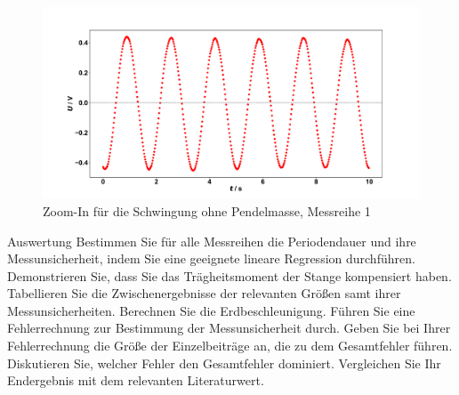 \begin{figure}[H]
	\centering
	\includegraphics[width=1\textwidth]{zoomin_schwingung1_ohne.pdf}
	\caption{Zoom-In für die Schwingung ohne Pendelmasse, Messreihe 1}
	\label{fig:zoomin_schwingung1_ohne}
\end{figure} 



\begin{aufgabe}{Auswertung}
  Bestimmen Sie für alle Messreihen die Periodendauer und ihre
  Messunsicherheit, indem Sie eine geeignete lineare Regression
  durchführen. Demonstrieren Sie, dass Sie das Trägheitsmoment der
  Stange kompensiert haben. Tabellieren Sie die Zwischenergebnisse
  der relevanten Größen samt ihrer Messunsicherheiten. Berechnen
  Sie die Erdbeschleunigung. Führen Sie eine Fehlerrechnung zur
  Bestimmung der Messunsicherheit durch. Geben Sie bei Ihrer
  Fehlerrechnung die Größe der Einzelbeiträge an, die zu dem
  Gesamtfehler führen. Diskutieren Sie, welcher Fehler den
  Gesamtfehler dominiert. Vergleichen Sie Ihr Endergebnis mit dem
  relevanten Literaturwert.
\end{aufgabe}



